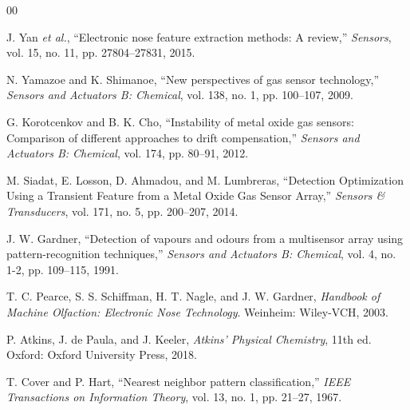 \documentclass[conference]{IEEEtran}
\begin{document}

\begin{thebibliography}{00}

J. Yan \textit{et al.}, ``Electronic nose feature extraction methods: A review,'' \textit{Sensors}, vol. 15, no. 11, pp. 27804--27831, 2015.

N. Yamazoe and K. Shimanoe, ``New perspectives of gas sensor technology,'' \textit{Sensors and Actuators B: Chemical}, vol. 138, no. 1, pp. 100--107, 2009.

G. Korotcenkov and B. K. Cho, ``Instability of metal oxide gas sensors: Comparison of different approaches to drift compensation,'' \textit{Sensors and Actuators B: Chemical}, vol. 174, pp. 80--91, 2012.

M. Siadat, E. Losson, D. Ahmadou, and M. Lumbreras, ``Detection Optimization Using a Transient Feature from a Metal Oxide Gas Sensor Array,'' \textit{Sensors \& Transducers}, vol. 171, no. 5, pp. 200--207, 2014.

J. W. Gardner, ``Detection of vapours and odours from a multisensor array using pattern-recognition techniques,'' \textit{Sensors and Actuators B: Chemical}, vol. 4, no. 1-2, pp. 109--115, 1991.

T. C. Pearce, S. S. Schiffman, H. T. Nagle, and J. W. Gardner, \textit{Handbook of Machine Olfaction: Electronic Nose Technology}. Weinheim: Wiley-VCH, 2003.

P. Atkins, J. de Paula, and J. Keeler, \textit{Atkins' Physical Chemistry}, 11th ed. Oxford: Oxford University Press, 2018.

T. Cover and P. Hart, ``Nearest neighbor pattern classification,'' \textit{IEEE Transactions on Information Theory}, vol. 13, no. 1, pp. 21--27, 1967.

\end{thebibliography}
\end{document}
